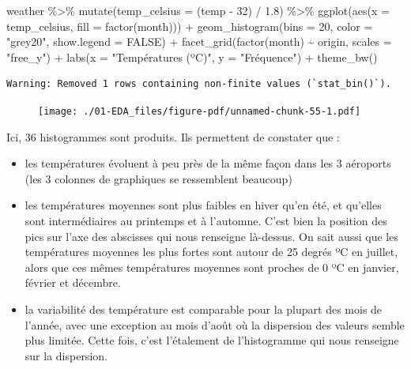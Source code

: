 \documentclass[
  a4paper,
  DIV=11,
  numbers=noendperiod,
  oneside]{scrreprt}
\newenvironment{Shaded}{}{}
\newcommand{\AttributeTok}[1]{\textcolor[rgb]{0.84,0.23,0.29}{#1}}
\newcommand{\ConstantTok}[1]{\textcolor[rgb]{0.00,0.36,0.77}{#1}}
\newcommand{\DecValTok}[1]{\textcolor[rgb]{0.00,0.36,0.77}{#1}}
\newcommand{\FloatTok}[1]{\textcolor[rgb]{0.00,0.36,0.77}{#1}}
\newcommand{\FunctionTok}[1]{\textcolor[rgb]{0.44,0.26,0.76}{#1}}
\newcommand{\NormalTok}[1]{\textcolor[rgb]{0.14,0.16,0.18}{#1}}
\newcommand{\SpecialCharTok}[1]{\textcolor[rgb]{0.00,0.36,0.77}{#1}}
\newcommand{\StringTok}[1]{\textcolor[rgb]{0.01,0.18,0.38}{#1}}
\providecommand{\tightlist}{%
  \setlength{\itemsep}{0pt}\setlength{\parskip}{0pt}}\usepackage{longtable,booktabs,array}
\begin{document}
\begin{Shaded}
\begin{Highlighting}[]
\NormalTok{weather }\SpecialCharTok{\%\textgreater{}\%} 
  \FunctionTok{mutate}\NormalTok{(}\AttributeTok{temp\_celsius =}\NormalTok{ (temp }\SpecialCharTok{{-}} \DecValTok{32}\NormalTok{) }\SpecialCharTok{/} \FloatTok{1.8}\NormalTok{) }\SpecialCharTok{\%\textgreater{}\%} 
  \FunctionTok{ggplot}\NormalTok{(}\FunctionTok{aes}\NormalTok{(}\AttributeTok{x =}\NormalTok{ temp\_celsius, }\AttributeTok{fill =} \FunctionTok{factor}\NormalTok{(month))) }\SpecialCharTok{+}
  \FunctionTok{geom\_histogram}\NormalTok{(}\AttributeTok{bins =} \DecValTok{20}\NormalTok{, }\AttributeTok{color =} \StringTok{"grey20"}\NormalTok{, }\AttributeTok{show.legend =} \ConstantTok{FALSE}\NormalTok{) }\SpecialCharTok{+}
  \FunctionTok{facet\_grid}\NormalTok{(}\FunctionTok{factor}\NormalTok{(month) }\SpecialCharTok{\textasciitilde{}}\NormalTok{ origin, }\AttributeTok{scales =} \StringTok{"free\_y"}\NormalTok{) }\SpecialCharTok{+}
  \FunctionTok{labs}\NormalTok{(}\AttributeTok{x =} \StringTok{"Températures (ºC)"}\NormalTok{, }\AttributeTok{y =} \StringTok{"Fréquence"}\NormalTok{) }\SpecialCharTok{+}
  \FunctionTok{theme\_bw}\NormalTok{()}
\end{Highlighting}
\end{Shaded}

\begin{verbatim}
Warning: Removed 1 rows containing non-finite values (`stat_bin()`).
\end{verbatim}

\begin{figure}[H]

{\centering \texttt{[image: ./01-EDA\_files/figure-pdf/unnamed-chunk-55-1.pdf]}

}

\end{figure}

Ici, 36 histogrammes sont produits. Ils permettent de constater que :

\begin{itemize}
\tightlist
\item
  les températures évoluent à peu près de la même façon dans les 3
  aéroports (les 3 colonnes de graphiques se ressemblent beaucoup)
\item
  les températures moyennes sont plus faibles en hiver qu'en été, et
  qu'elles sont intermédiaires au printemps et à l'automne. C'est bien
  la position des pics sur l'axe des abscisses qui nous renseigne
  là-dessus. On sait aussi que les températures moyennes les plus fortes
  sont autour de 25 degrés ºC en juillet, alors que ces mêmes
  températures moyennes sont proches de 0 ºC en janvier, février et
  décembre.
\item
  la variabilité des température est comparable pour la plupart des mois
  de l'année, avec une exception au mois d'août où la dispersion des
  valeurs semble plus limitée. Cette fois, c'est l'étalement de
  l'histogramme qui nous renseigne sur la dispersion.
\end{itemize}
\end{document}
